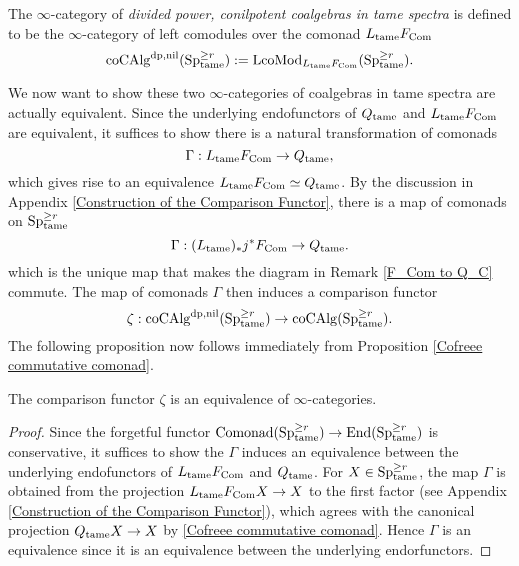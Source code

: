 \begin{definition}
\label{Def of tame dp, nil coalgebras}
    The $\infty$-category of \emph{divided power, conilpotent coalgebras in tame spectra} is defined to be the $\infty$-category of left comodules over the comonad $L_{\operatorname{\operatorname{tame}}}F_{\operatorname{Com}}$
    \[
    \operatorname{coCAlg}^{\operatorname{dp}, \operatorname{nil}}(\operatorname{Sp}_{\operatorname{\operatorname{tame}}}^{\geq r}):= \operatorname{LcoMod}_{L_{\operatorname{\operatorname{tame}}}F_{\operatorname{Com}}}(\operatorname{Sp}_{\operatorname{\operatorname{tame}}}^{\geq r}).
    \]
\end{definition}
We now want to show these two $\infty$-categories of coalgebras in tame spectra are actually equivalent. 
Since the underlying endofunctors of $Q_{\operatorname{\operatorname{tame}}}$ and $L_{\operatorname{\operatorname{tame}}}F_{\operatorname{Com}}$ are equivalent, it suffices to show there is a natural transformation of comonads
$$
\Gamma: L_{\operatorname{\operatorname{tame}}}F_{\operatorname{Com}}\to 
Q_{\operatorname{\operatorname{tame}}},
$$
which gives rise to an equivalence $L_{\operatorname{\operatorname{tame}}}F_{\operatorname{Com}}\simeq Q_{\operatorname{\operatorname{tame}}}$.
By the discussion in Appendix \ref{Construction of the Comparison Functor}, there is a map of comonads on $\operatorname{Sp}^{\geq r}_{\operatorname{\operatorname{tame}}}$
$$
\Gamma: (L_{\operatorname{\operatorname{tame}}})_{*} j^{*} F_{\operatorname{Com}} \to Q_{\operatorname{\operatorname{tame}}}.
$$
which is the unique map that makes the diagram in Remark \ref{F_Com to Q_C} commute.
The map of comonads $\Gamma$ then induces a comparison functor 
$$
\zeta:\operatorname{coCAlg}^{\operatorname{dp},\operatorname{nil}}(\operatorname{Sp}^{\geq r}_{\operatorname{\operatorname{tame}}}) \to
\operatorname{coCAlg}(\operatorname{Sp}^{\geq r}_{\operatorname{\operatorname{tame}}}).
$$
The following proposition now follows immediately from Proposition \ref{Cofreee commutative comonad}.
\begin{proposition}
\label{all coalgebras are equivalent}
	The comparison functor $\zeta$ is an equivalence of $\infty$-categories.
\end{proposition}
\begin{proof}
Since the forgetful functor $\operatorname{Comonad}(\operatorname{Sp}^{\geq r}_{\operatorname{\operatorname{tame}}}) \to \operatorname{End}(\operatorname{Sp}^{\geq r}_{\operatorname{\operatorname{tame}}})$ is conservative,
it suffices to show the $\Gamma$ induces an equivalence between the underlying endofunctors of $L_{\operatorname{\operatorname{tame}}}F_{\operatorname{Com}}$ and $Q_{\operatorname{\operatorname{tame}}}$. For $X\in \operatorname{Sp}^{\geq r}_{\operatorname{\operatorname{tame}}}$, the map $\Gamma$ is obtained from the projection $L_{\operatorname{\operatorname{tame}}}F_{\operatorname{Com}}X \to X$ to the first factor (see Appendix \ref{Construction of the Comparison Functor}), which agrees with the canonical projection $Q_{\operatorname{\operatorname{tame}}}X\to X$ by \ref{Cofreee commutative comonad}. Hence $\Gamma$ is an equivalence since it is an equivalence between the underlying endorfunctors.

\end{proof}





